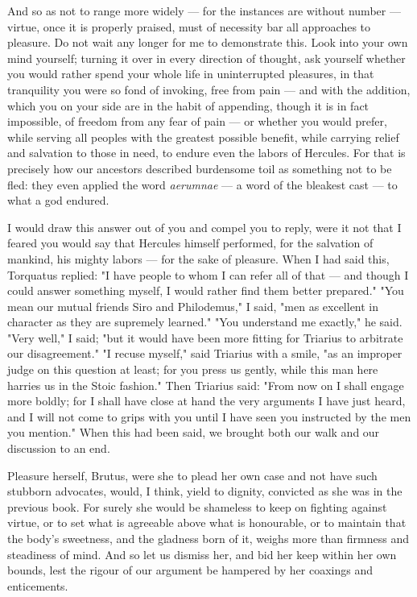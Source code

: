 And so as not to range more widely — for the instances are without number — virtue, once it is properly praised, must of necessity bar all approaches to pleasure. Do not wait any longer for me to demonstrate this. Look into your own mind yourself; turning it over in every direction of thought, ask yourself whether you would rather spend your whole life in uninterrupted pleasures, in that tranquility you were so fond of invoking, free from pain — and with the addition, which you on your side are in the habit of appending, though it is in fact impossible, of freedom from any fear of pain — or whether you would prefer, while serving all peoples with the greatest possible benefit, while carrying relief and salvation to those in need, to endure even the labors of Hercules. For that is precisely how our ancestors described burdensome toil as something not to be fled: they even applied the word \textit{aerumnae} — a word of the bleakest cast — to what a god endured.

I would draw this answer out of you and compel you to reply, were it not that I feared you would say that Hercules himself performed, for the salvation of mankind, his mighty labors — for the sake of pleasure. When I had said this, Torquatus replied: "I have people to whom I can refer all of that — and though I could answer something myself, I would rather find them better prepared." "You mean our mutual friends Siro and Philodemus," I said, "men as excellent in character as they are supremely learned." "You understand me exactly," he said. "Very well," I said; "but it would have been more fitting for Triarius to arbitrate our disagreement." "I recuse myself," said Triarius with a smile, "as an improper judge on this question at least; for you press us gently, while this man here harries us in the Stoic fashion." Then Triarius said: "From now on I shall engage more boldly; for I shall have close at hand the very arguments I have just heard, and I will not come to grips with you until I have seen you instructed by the men you mention." When this had been said, we brought both our walk and our discussion to an end.



 Pleasure herself, Brutus, were she to plead her own case and not have such stubborn advocates, would, I think, yield to dignity, convicted as she was in the previous book. For surely she would be shameless to keep on fighting against virtue, or to set what is agreeable above what is honourable, or to maintain that the body's sweetness, and the gladness born of it, weighs more than firmness and steadiness of mind. And so let us dismiss her, and bid her keep within her own bounds, lest the rigour of our argument be hampered by her coaxings and enticements.

